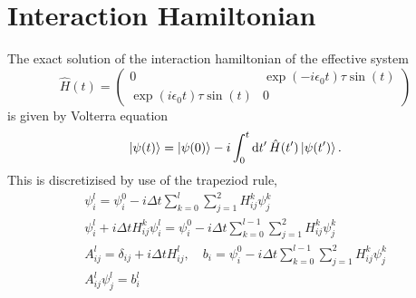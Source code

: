 \documentclass{article}
\begin{document}
\section*{Interaction Hamiltonian}
    The exact solution of the interaction hamiltonian of the effective system
    \begin{equation*}
        \hat H(t) = 
        \begin{pmatrix}
            0 & \exp(-i \epsilon_0 t) \tau \sin(t)\\
            \exp(i \epsilon_0 t) \tau \sin(t) & 0
        \end{pmatrix}
    \end{equation*}
    is given by Volterra equation
    \begin{equation*}
        \ket{\psi(t)} = \ket{\psi(0)} - i\int_0^t \dd{t'} \hat H(t')\ket{\psi(t')}.
    \end{equation*}
    This is discretizised by use of the trapeziod rule,
    \begin{align*}
        \psi_i^l = \psi_i^0 - i \Delta t \sum_{k=0}^{l} \sum_{j=1}^2 H_{ij}^k \psi_j^k \\
        \psi_i^l + i \Delta t H_{ij}^k \psi_i^l = \psi_i^0 - i \Delta t \sum_{k=0}^{l-1} \sum_{j=1}^2 H_{ij}^k \psi_j^k \\
        A_{ij}^l = \delta_{ij} + i\Delta t H_{ij}^l, \quad b_i = \psi_i^0 - i \Delta t \sum_{k=0}^{l-1} \sum_{j=1}^2 H_{ij}^k \psi_j^k \\
        A_{ij}^l \psi_j^l = b_i^l
    \end{align*}
\end{document}
